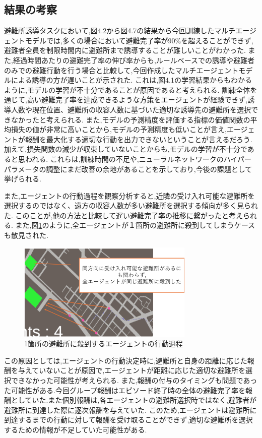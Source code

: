 \subsection{結果の考察}
避難所誘導タスクにおいて,図4.2から図4.7の結果から今回訓練したマルチエージェントモデルでは,多くの場合において避難完了率が90\%を超えることができず,避難者全員を制限時間内に避難所まで誘導することが難しいことがわかった.
また,経過時間あたりの避難完了率の伸び率からも,ルールベースでの誘導や避難者のみでの避難行動を行う場合と比較して,今回作成したマルチエージェントモデルによる誘導の方が遅いことが示された.
これは,図4.1の学習結果からもわかるように,モデルの学習が不十分であることが原因であると考えられる.
訓練全体を通じて,高い避難完了率を達成できるような方策をエージェントが経験できず,誘導人数や現在位置、避難所の収容人数に基づいた適切な誘導先の避難所を選択できなかったと考えられる.
また,モデルの予測精度を評価する指標の価値関数の平均損失の値が非常に高いことから,モデルの予測精度も低いことが言え,エージェントが報酬を最大化する適切な行動を出力できないということが言えるだろう.加えて,損失関数の減少が収束していないことからも,モデルの学習が不十分であると思われる.
これらは,訓練時間の不足や,ニューラルネットワークのハイパーパラメータの調整にまだ改善の余地があることを示しており,今後の課題として挙げられる.

また,エージェントの行動過程を観察分析すると,近隣の受け入れ可能な避難所を選択するのではなく、遠方の収容人数が多い避難所を選択する傾向が多く見られた.
このことが,他の方法と比較して遅い避難完了率の推移に繋がったと考えられる.
また,図\ref{fig:GuidAgent-Tink1}のように,全エージェントが１箇所の避難所に殺到してしまうケースも散見された.
\begin{figure}[H] 
  \centering 
  \includegraphics[width=0.75\textwidth]{Figures/GuidAgent-Tink1.png}
  \caption{1箇所の避難所に殺到するエージェントの行動過程}
  \label{fig:GuidAgent-Tink1}
\end{figure}
この原因としては,エージェントの行動決定時に,避難所と自身の距離に応じた報酬を与えていないことが原因で,エージェントが距離に応じた適切な避難所を選択できなかった可能性が考えられる.
また,報酬の付与のタイミングも問題であった可能性がある.今回グループ報酬はエピソード終了時の全体の避難完了率を報酬としていた.また個別報酬は,各エージェントの避難所選択時ではなく,避難者が避難所に到達した際に逐次報酬を与えていた.
このため,エージェントは避難所に到達するまでの行動に対して報酬を受け取ることができず,適切な避難所を選択するための情報が不足していた可能性がある.

